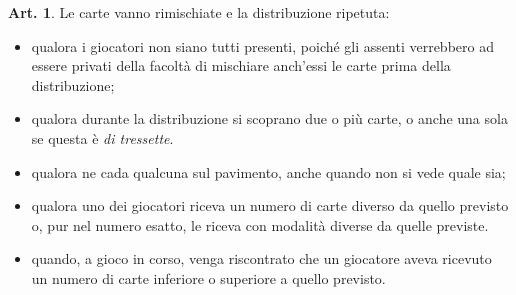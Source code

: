\documentclass[italian,a4paper]{article}
\theoremstyle{definition}
\newtheorem{art}{Art.}
\newenvironment{packeditem}{
\begin{itemize}
  \setlength{\itemsep}{1pt}
  \setlength{\parskip}{0pt}
  \setlength{\parsep}{0pt}
}{\end{itemize}}
\begin{document}
\begin{art}
    Le carte vanno rimischiate e la distribuzione ripetuta:
    \begin{packeditem}
\item    qualora i giocatori non siano tutti presenti, poiché gli assenti verrebbero ad essere privati della facoltà di mischiare anch'essi le carte prima della distribuzione;
\item    qualora durante la distribuzione si scoprano due o più carte, o anche una sola se questa è \emph{di tressette}.
\item    qualora ne cada qualcuna sul pavimento, anche quando non si vede quale sia;
\item    qualora uno dei giocatori riceva un numero di carte diverso da quello previsto o, pur nel numero esatto, le riceva con modalità diverse da quelle previste.
\item      quando, a gioco in corso, venga riscontrato che un giocatore aveva ricevuto un numero di carte inferiore o superiore a quello previsto.
    \end{packeditem}
\end{art}
\end{document}
